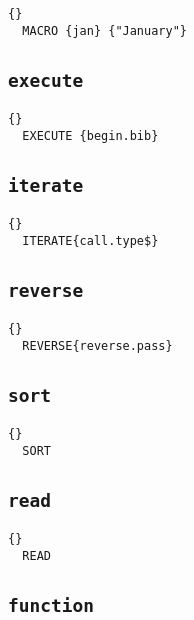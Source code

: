 \begin{lstlisting}{}
  MACRO {jan} {"January"}
\end{lstlisting}

\subsection{\texttt{execute}}

\INCOMPLETE

\begin{lstlisting}{}
  EXECUTE {begin.bib}
\end{lstlisting}

\subsection{\texttt{iterate}}

\INCOMPLETE

\begin{lstlisting}{}
  ITERATE{call.type$}
\end{lstlisting}

\subsection{\texttt{reverse}}

\INCOMPLETE

\begin{lstlisting}{}
  REVERSE{reverse.pass}
\end{lstlisting}

\subsection{\texttt{sort}}

\INCOMPLETE

\begin{lstlisting}{}
  SORT
\end{lstlisting}

\subsection{\texttt{read}}

\INCOMPLETE

\begin{lstlisting}{}
  READ
\end{lstlisting}

\subsection{\texttt{function}}

